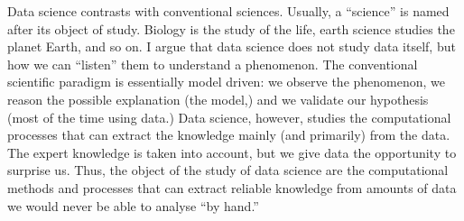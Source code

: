 Data science contrasts with conventional sciences.  Usually, a ``science'' is named after
its object of study.  Biology is the study of the life, earth science studies the planet
Earth, and so on.  I argue that data science does not study data itself, but how we can
``listen'' them to understand a phenomenon.  The conventional scientific paradigm is
essentially model driven: we observe the phenomenon, we reason the possible explanation
(the model,) and we validate our hypothesis (most of the time using data.)  Data science,
however, studies the computational processes that can extract the knowledge mainly (and
primarily) from the data.  The expert knowledge is taken into account, but we give data
the opportunity to surprise us.  Thus, the object of the study of data science are the
computational methods and processes that can extract reliable knowledge from amounts of
data we would never be able to analyse ``by hand.''
